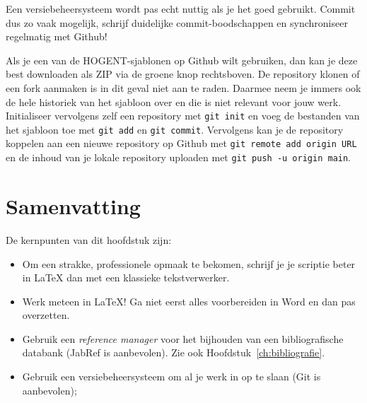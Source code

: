 Een versiebeheersysteem wordt pas echt nuttig als je het goed gebruikt. Commit dus zo vaak mogelijk, schrijf duidelijke commit-boodschappen en synchroniseer regelmatig met Github!

Als je een van de HOGENT-sjablonen op Github wilt gebruiken, dan kan je deze best downloaden als ZIP via de groene knop rechtsboven. De repository klonen of een fork aanmaken is in dit geval niet aan te raden. Daarmee neem je immers ook de hele historiek van het sjabloon over en die is niet relevant voor jouw werk. Initialiseer vervolgens zelf een repository met \texttt{git init} en voeg de bestanden van het sjabloon toe met \texttt{git add} en \texttt{git commit}. Vervolgens kan je de repository koppelen aan een nieuwe repository op Github met \texttt{git remote add origin URL} en de inhoud van je lokale repository uploaden met \texttt{git push -u origin main}.

\section{Samenvatting}%
\label{sec:voorbereiding-samenvatting}

De kernpunten van dit hoofdstuk zijn:

\begin{itemize}
  \item Om een strakke, professionele opmaak te bekomen, schrijf je je scriptie beter in {\LaTeX} dan met een klassieke tekstverwerker.
  \item Werk meteen in {\LaTeX}! Ga niet eerst alles voorbereiden in Word en dan pas overzetten.
  \item Gebruik een \emph{reference manager} voor het bijhouden van een bibliografische databank (JabRef is aanbevolen). Zie ook Hoofdstuk~\ref{ch:bibliografie}.
  \item Gebruik een versiebeheersysteem om al je werk in op te slaan (Git is aanbevolen);
\end{itemize}
